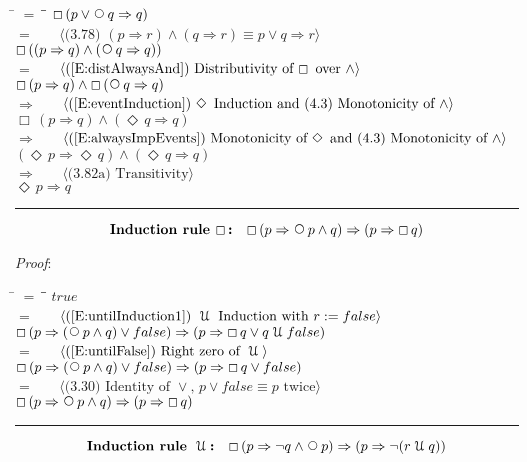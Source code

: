 \documentclass[12pt, fleqn, leqno]{article}
\newcommand{\lgap}{2pt}                             %
\newcommand{\mymathindent}{24pt}                    %
\newcommand{\impl}{\ensuremath{\Rightarrow}}        %
\newcommand{\Until}{\;\mathcal{U}\;}
\newcommand{\Next}{\;\,\text{\raisebox{3.5pt}{\circle{6}}}}
\newcommand{\Event}{\Diamond\,}
\newcommand{\Always}{\Box\,}
\newcommand{\myqed}{\rule[-.23ex]{1.2ex}{2.0ex}}
\newcommand{\myqedtab}{\hspace{384pt}}              %
\newcommand{\Gll} {\langle}                         %
\newcommand{\Ggg} {\rangle}                         %
\newcommand{\Hint}[1]     {\ \ \ $\Gll              \mbox{#1} \Ggg$ }   %
\begin{document}
\begin{tabbing}
\hspace{\mymathindent} \= $= \;$ \= \myqedtab \= \kill
  \> \>   $\Always (p \lor\Next q \impl q)$\\[\lgap]
  \> $=$  \>  \Hint{(3.78) $(p\impl r) \land (q\impl r) \equiv p\lor q\impl r$}\\[\lgap]
  \> \>   $\Always (( p \impl q) \land (\Next q \impl q))$\\[\lgap]
  \> $=$  \>  \Hint{(\ref{E:distAlwaysAnd}) Distributivity of $\Always$ over $\land$}\\[\lgap]
  \> \>   $\Always ( p \impl q) \land \Always (\Next q \impl q)$\\[\lgap]
  \> $\impl$  \>  \Hint{(\ref{E:eventInduction}) $\Event$ Induction and (4.3) Monotonicity of $\land$}\\[\lgap]
  \> \>   $\Always ( p \impl q) \land (\Event q \impl q)$\\[\lgap]
  \> $\impl$ \> \Hint{(\ref{E:alwaysImpEvents}) Monotonicity of $\Event$ and (4.3) Monotonicity of $\land$} \\[\lgap]
  \> \>   $(\Event p \impl \Event q) \land (\Event q \impl q) $\\[\lgap]
  \> $\impl$  \>  \Hint{(3.82a) Transitivity}\\[\lgap]
  \> \>   $\Event p \impl q$\quad \myqed
\end{tabbing}
\begin{equation}\label{E:InductRuleAlways}
\textbf{Induction rule $\Always$:}\quad \Always ( p \impl \Next p \land q) \impl (p \impl \Always q)
\end{equation}

\emph{Proof}:
\begin{tabbing}
\hspace{\mymathindent} \= $= \;$ \= \myqedtab \= \kill
  \> \>   $true$\\[\lgap]
  \> $=$  \>  \Hint{(\ref{E:untilInduction1}) $\Until$ Induction with $r:=false$}\\[\lgap]
  \> \>   $\Always (p \impl (\Next p\land q)\lor false) \impl (p \impl \Always q\lor q\Until false)$\\[\lgap]
  \> $=$  \>  \Hint{(\ref{E:untilFalse}) Right zero of $\Until$}\\[\lgap]
  \> \>   $\Always (p \impl (\Next p\land q)\lor false) \impl (p \impl \Always q\lor false)$\\[\lgap]
  \> $=$ \> \Hint{(3.30) Identity of $\lor$, $p\lor false\equiv p$ twice} \\[\lgap]
  \> \>   $\Always ( p \impl \Next p \land q) \impl (p \impl \Always q)$\quad \myqed
\end{tabbing}
\begin{equation}\label{E:InductRuleUntil}
\textbf{Induction rule $\Until$:}\quad \Always ( p \impl \neg q \land \Next p) \impl (p \impl \neg(r\Until q))
\end{equation}
\end{document}
